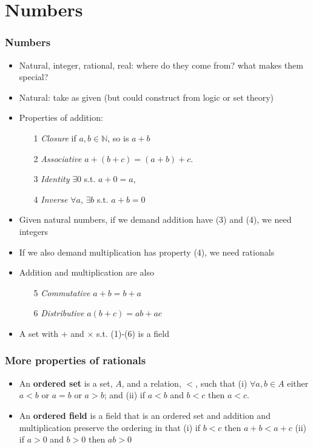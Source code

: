 \documentclass[compress]{beamer}
\begin{document}
\section{Numbers \label{s:numbers}}

\begin{frame}
  \frametitle{Numbers}
  \begin{itemize}
  \item Natural, integer, rational, real: where do they come from?
    what makes them special?
  \item Natural: take as given (but could construct from logic or set
    theory) 
  \end{itemize}
\end{frame}

\begin{frame}
  \begin{itemize}
  \item Properties of addition:
    \begin{itemize}
    \item[1] \emph{Closure} if $a, b \in \mathbb{N}$, so is $a + b$ 
    \item[2] \emph{Associative} $a + (b + c) = (a + b) + c$. 
    \item[3] \emph{Identity} $\exists 0$ s.t. $a + 0 = a$,
    \item[4] \emph{Inverse} $\forall a$, $\exists b$ s.t. $a + b = 0$
    \end{itemize}
  \item Given natural numbers, if we demand addition have (3) and (4),
    we need integers    
  \item If we also demand multiplication has property (4), we need
    rationals
  \item Addition and multiplication are also
    \begin{itemize}
    \item[5] \emph{Commutative} $ a + b = b + a$
    \item[6] \emph{Distributive} $a (b + c) = ab + ac$
    \end{itemize} 
  \item A set with $+$ and $\times$ s.t. (1)-(6) is a field
  \end{itemize}
\end{frame}

\begin{frame}
  \frametitle{More properties of rationals}
  \begin{itemize}
  \item An \textbf{ordered set} is a set, $A$, and a relation, $<$,
    such that (i) $\forall a,b \in A$ either $a < b$ or $a = b$ or $a
    > b$; and (ii) if $a < b$ and $b < c$ then $a < c$.
  \item An \textbf{ordered field} is a field that is an ordered set
    and addition and multiplication preserve the ordering in that (i)
    if $b<c$ then $a + b < a + c$ (ii) if $a>0$ and $b>0$ then $ab>0$
  \end{itemize}
\end{frame}
\end{document}
